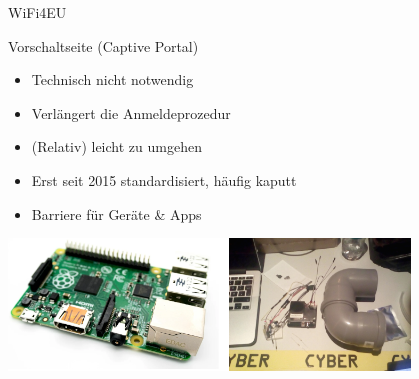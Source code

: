 \documentclass[t,aspectratio=169]{beamer}
\begin{document}
\begin{frame}{WiFi4EU}
\end{frame}
  
\begin{frame}{Vorschaltseite (Captive Portal)}
\begin{itemize}
 \item Technisch nicht notwendig
 \item Verlängert die Anmeldeprozedur
 \item (Relativ) leicht zu umgehen
 \item Erst seit 2015 standardisiert, häufig kaputt
 \item Barriere für Geräte \& Apps
\end{itemize}
        \begin{center}
          \includegraphics[width=0.8\textwidth]{Bilder/iot}
        \end{center}

\end{frame}
  
\end{document}
